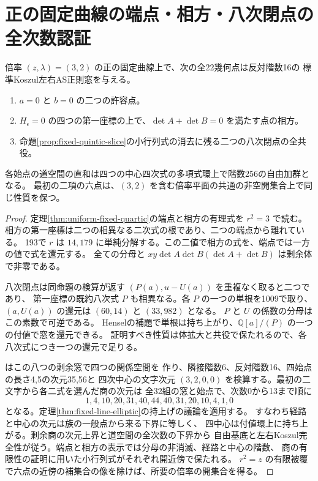 \section{正の固定曲線の端点・相方・八次閉点の全次数認証}
\label{sec:fixed-residual-regularity}
\begin{proposition}\label{prop:fixed-residual-regularity}
倍率 $(z,\lambda)=(3,2)$ の正の固定曲線上で、次の全22幾何点は反対階数16の
標準Koszul左右AS正則窓を与える。
\begin{enumerate}
\item $a=0$ と $b=0$ の二つの許容点。
\item $H_\epsilon=0$ の四つの第一座標の上で、$\det A+\det B=0$ を満たす点の相方。
\item 命題\ref{prop:fixed-quintic-slice}の小行列式の消去に残る二つの八次閉点の全共役。
\end{enumerate}
各始点の道空間の直和は四つの中心四次式の多項式環上で階数256の自由加群となる。
最初の二項の六点は、$(3,2)$ を含む倍率平面の共通の非空開集合上で同じ性質を保つ。
\end{proposition}
\begin{proof}
定理\ref{thm:uniform-fixed-quartic}の端点と相方の有理式を $r^2=3$ で読む。
相方の第一座標は二つの相異なる二次式の根であり、二つの端点から離れている。
193で $r$ は $14,179$ に単純分解する。この二値で相方の式を、端点では一方の値で式を還元する。
全ての分母と $xy\det A\det B(\det A+\det B)$ は剰余体で非零である。

八次閉点は同命題の検算が返す $(P(a),u-U(a))$ を重複なく取ると二つであり、
第一座標の既約八次式 $P$ も相異なる。各 $P$ の一つの単根を1009で取り、
$(a,U(a))$ の還元は $(60,14)$ と $(33,982)$ となる。
$P$ と $U$ の係数の分母はこの素数で可逆である。
Henselの補題で単根は持ち上がり、$\mathbb Q[a]/(P)$ の一つの付値で窓を還元できる。
証明すべき性質は体拡大と共役で保たれるので、各八次式につき一つの還元で足りる。

 はこの八つの剰余窓で四つの関係空間を
作り、隣接階数6、反対階数16、四始点の長さ4,5の次元35,56と
四次中心の文字次元 $(3,2,0,0)$ を検算する。最初の二文字から各二式を選んだ商の次元は
全32組の窓と始点で、次数0から13まで順に
\[
 1,4,10,20,31,40,44,40,31,20,10,4,1,0
\]
となる。定理\ref{thm:fixed-line-elliptic}の持上げの議論を適用する。
すなわち経路と中心の次元は族の一般点から来る下界に等しく、
四中心は付値環上に持ち上がる。剰余商の次元上界と道空間の全次数の下界から
自由基底と左右Koszul完全性が従う。端点と相方の表示では分母の非消滅、経路と中心の階数、
商の有限性の証明に用いた小行列式がそれぞれ開近傍で保たれる。
$r^2=z$ の有限被覆で六点の近傍の補集合の像を除けば、所要の倍率の開集合を得る。
\end{proof}
